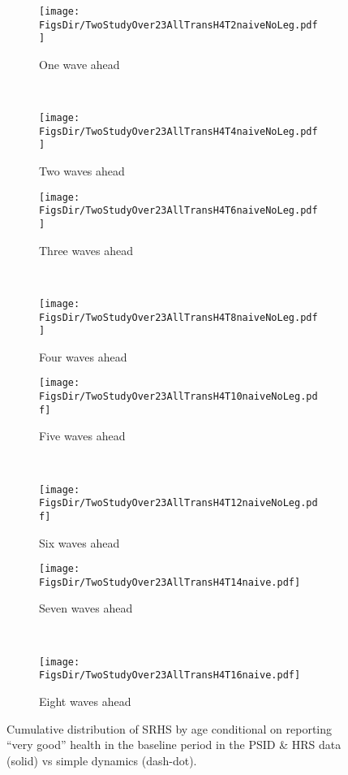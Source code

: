 \documentclass[12pt,pdftex,letterpaper]{article}
\newcommand{\RootDir}{..}
\newcommand{\FigsDir}{\RootDir/Figures}
\begin{document}
\begin{figure}
	\centering
	\begin{subfigure}[b]{0.48\textwidth}
		\texttt{[image: \\FigsDir/TwoStudyOver23AllTransH4T2naiveNoLeg.pdf]}
		\caption{One wave ahead}\label{fig:Naive1AheadVeryGood}
	\end{subfigure}
	~
	\begin{subfigure}[b]{0.48\textwidth}
		\texttt{[image: \\FigsDir/TwoStudyOver23AllTransH4T4naiveNoLeg.pdf]}
		\caption{Two waves ahead}\label{fig:Naive2AheadVeryGood}
	\end{subfigure}
	
	\begin{subfigure}[b]{0.48\textwidth}
		\texttt{[image: \\FigsDir/TwoStudyOver23AllTransH4T6naiveNoLeg.pdf]}
		\caption{Three waves ahead}\label{fig:Naive3AheadVeryGood}
	\end{subfigure}
	~
	\begin{subfigure}[b]{0.48\textwidth}
		\texttt{[image: \\FigsDir/TwoStudyOver23AllTransH4T8naiveNoLeg.pdf]}
		\caption{Four waves ahead}\label{fig:Naive4AheadVeryGood}
	\end{subfigure}
	
	\begin{subfigure}[b]{0.48\textwidth}
		\texttt{[image: \\FigsDir/TwoStudyOver23AllTransH4T10naiveNoLeg.pdf]}
		\caption{Five waves ahead}\label{fig:Naive5AheadVeryGood}
	\end{subfigure}
	~
	\begin{subfigure}[b]{0.48\textwidth}
		\texttt{[image: \\FigsDir/TwoStudyOver23AllTransH4T12naiveNoLeg.pdf]}
		\caption{Six waves ahead}\label{fig:Naive6AheadVeryGood}
	\end{subfigure}
	
	\begin{subfigure}[b]{0.48\textwidth}
		\texttt{[image: \\FigsDir/TwoStudyOver23AllTransH4T14naive.pdf]}
		\caption{Seven waves ahead}\label{fig:Naive7AheadVeryGood}
	\end{subfigure}
	~
	\begin{subfigure}[b]{0.48\textwidth}
		\texttt{[image: \\FigsDir/TwoStudyOver23AllTransH4T16naive.pdf]}
		\caption{Eight waves ahead}\label{fig:Naive8AheadVeryGood}
	\end{subfigure}
	\caption{Cumulative distribution of SRHS by age conditional on reporting ``very good'' health in the baseline period in the PSID \& HRS data (solid) vs simple dynamics (dash-dot).}\label{fig:NaiveTransVGa}
\end{figure}
\end{document}
